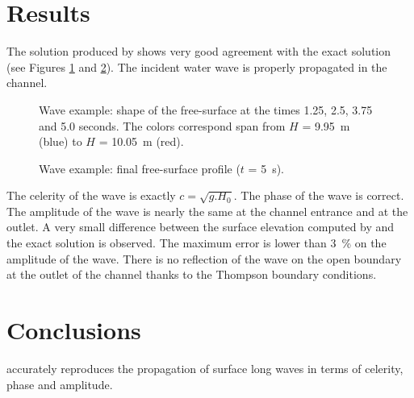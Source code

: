 \section{Results}
The solution produced by  shows very good agreement with
the exact solution (see Figures \ref{fig:wave1} and \ref{fig:wave2}).
The incident water wave is properly propagated in the channel.

\begin{figure}
    \caption{Wave example: shape of the free-surface at the times 1.25, 2.5, 3.75 and 5.0 seconds. The colors correspond span
    from $H$ = 9.95~m (blue) to $H$ = 10.05~m (red).}
    \label{fig:wave1}
\end{figure}
\begin{figure}
    \caption{Wave example: final free-surface profile ($t$ = 5~s).}
    \label{fig:wave2}
\end{figure}

The celerity of the wave is exactly $c = \sqrt{g.H_0}$.
The phase of the wave is correct. The amplitude of the wave is nearly
the same at the channel entrance and at the outlet. A very small
difference between the surface elevation computed by 
and the exact solution is observed. The maximum error is lower
than 3~\% on the amplitude of the wave.
There is no reflection of the wave on the open boundary at the outlet
of the channel thanks to the Thompson boundary conditions.
\section{Conclusions}
 accurately reproduces the propagation of surface long waves in
terms of celerity, phase and amplitude.
